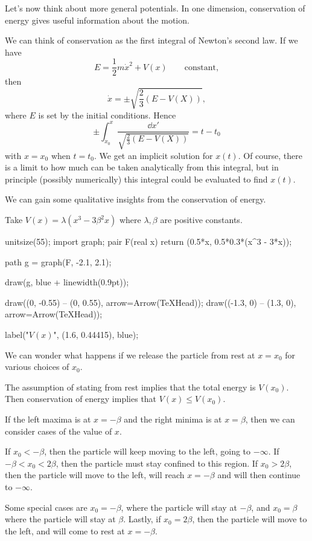 \documentclass[a4paper]{scrreprt}
\begin{document}
Let's now think about more general potentials. In one dimension, conservation of energy gives useful information about the motion. 

We can think of conservation as the first integral of Newton's second law. If we have
$$
E = \frac{1}{2} m \dot{x}^2 + V(x) \quad \quad \text{constant},
$$
then
$$
\dot{x} = \pm\sqrt{\frac{2}{3}(E - V(X))},
$$
where $E$ is set by the initial conditions.
Hence
$$
\pm \int_{x_0}^{x} \frac{\dd x'}{\sqrt{\frac{2}{3}(E - V(X))}} = t - t_0
$$
with $x = x_0$ when $t = t_0$. We get an implicit solution for $x(t)$. Of course, there is a limit to how much can be taken analytically from this integral, but  
in principle (possibly numerically) this integral could be evaluated to find $x(t)$.

We can gain some qualitative insights from the conservation of energy.

\begin{example}
	Take $V(x) = \lambda(x^3 - 3 \beta^2 x)$ where $\lambda, \beta$ are positive constants.
	\begin{center}
		\begin{asy}
			unitsize(55);
			import graph;
			pair F(real x) {
				return (0.5*x, 0.5*0.3*(x^3 - 3*x));
			}
	
			path g = graph(F, -2.1, 2.1);
	
			draw(g, blue + linewidth(0.9pt));
	
			draw((0, -0.55) -- (0, 0.55), arrow=Arrow(TeXHead));
			draw((-1.3, 0) -- (1.3, 0), arrow=Arrow(TeXHead));

			label("$V(x)$", (1.6, 0.44415), blue);
		\end{asy}
	\end{center}
	We can wonder what happens if we release the particle from rest at $x=x_0$ for various choices of $x_0$. 

	The assumption of stating from rest implies that the total energy is $V(x_0)$. Then conservation of energy implies that $V(x) \leq V(x_0)$.

	If the left maxima is at $x = -\beta$ and the right minima is at $x = \beta$, then we can consider cases of the value of $x$. 

	If $x_0 < -\beta$, then the particle will keep moving to the left, going to $- \infty$. If $- \beta < x_0 < 2 \beta$, then the particle must stay confined to this region. If $x_0 > 2\beta$, then the particle will move to the left, will reach $x = -\beta$ and will then continue to $- \infty$.
	
	Some special cases are $x_0 = - \beta$, where the particle will stay at $-\beta$, and $x_0 = \beta$ where the particle will stay at $\beta$. Lastly, if $x_0 = 2 \beta$, then the particle will move to the left, and will come to rest at $x = - \beta$.
\end{example}
\end{document}
